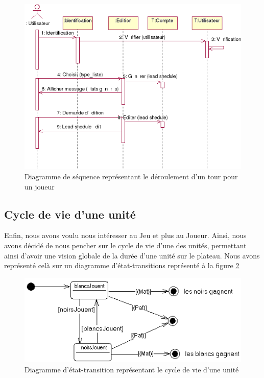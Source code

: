 \begin{figure}[!h] 
\centerline{\includegraphics[scale=0.60]{img/sequence_jeu_ex.png}}
   \caption{\label{étiquette} Diagramme de séquence représentant le déroulement d'un tour pour un joueur}
\label{sequenceJeu}
\end{figure}

\subsection{Cycle de vie d'une unité}
Enfin, nous avons voulu nous intéresser au Jeu et plus au Joueur. Ainsi, nous avons décidé de nous pencher sur le cycle de vie d'une des unités, permettant ainsi d'avoir une vision globale de la durée d'une unité sur le plateau. Nous avons représenté celà sur un diagramme d'état-transitions représenté à la figure \ref{etata}

\begin{figure}[!h] 
\centerline{\includegraphics[scale=0.60]{img/etata_ex.png}}
   \caption{\label{étiquette} Diagramme d'état-transition représentant le cycle de vie d'une unité}
\label{etata}
\end{figure}
\newpage
